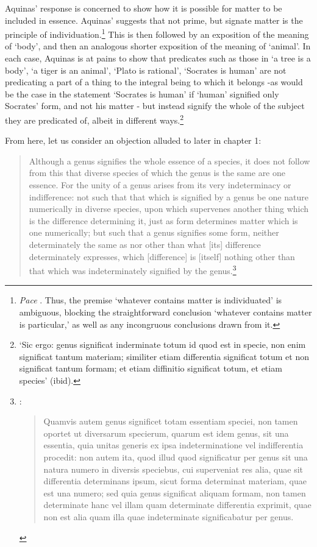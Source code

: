\documentclass[]{article}
\begin{document}
Aquinas' response is concerned to show how it is possible for matter to be included in essence.  Aquinas' suggests that not prime, but signate matter is the principle of individuation.\footnote{\textit{Pace} \autocite[371]{Lagerlund2004}. Thus, the premise `whatever contains matter is individuated' is ambiguous, blocking the straightforward conclusion `whatever contains matter is particular,' as well as any incongruous conclusions drawn from it.} This is then followed by an exposition of the meaning of `body', and then an analogous shorter exposition of the meaning of `animal'. In each case, Aquinas is at pains to show that predicates such as those in `a tree is a body', `a tiger is an animal', `Plato is rational', `Socrates is human' are not predicating a part of a thing to the integral being to which it belongs -as would be the case in the statement `Socrates is human' if `human' signified only Socrates' form, and not his matter - but instead signify the whole of the subject they are predicated of, albeit in different ways.\footnote{`Sic ergo: genus significat inderminate totum id quod est in specie, non enim significat tantum materiam; similiter etiam differentia significat totum et non significat tantum formam; et etiam diffinitio significat totum, et etiam species' (ibid).}

From here, let us consider an objection alluded to later in chapter 1:
\begin{quote}
Although a genus signifies the whole essence of a species, it does not follow from this that diverse species of which the genus is the same are one essence. For the unity of a genus arises from its very indeterminacy or indifference: not such that that which is signified by a genus be one nature numerically in diverse species, upon which supervenes another thing which is the difference determining it, just as form determines matter which is one numerically; but such that a genus signifies some form, neither determinately the same as nor other than what [its] difference determinately expresses, which [difference] is [itself] nothing other than that which was indeterminately signified by the genus.\footnote{\autocite[ch. 1]{AquinasDEE}: 
	\begin{quote}
	Quamvis autem genus significet totam essentiam speciei, non tamen oportet ut diversarum specierum, quarum est idem genus, sit una essentia, quia unitas generis ex ipsa indeterminatione vel indifferentia procedit: non autem ita, quod illud quod significatur per genus sit una natura numero in diversis speciebus, cui superveniat res alia, quae sit differentia determinans ipsum, sicut forma determinat materiam, quae est una numero; sed quia genus significat aliquam formam, non tamen determinate hanc vel illam quam determinate differentia exprimit, quae non est alia quam illa quae indeterminate significabatur per genus.
	\end{quote}}
\end{quote}	
	
\end{document}
